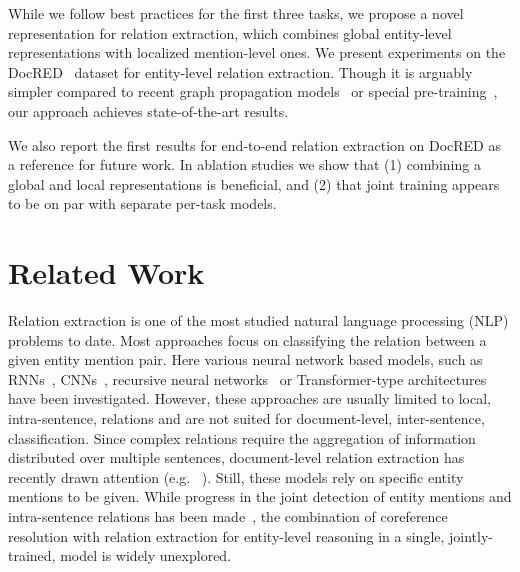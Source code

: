 \documentclass[11pt,a4paper]{article}
\begin{document}
While we follow best practices for the first three tasks, we propose a novel representation for relation extraction, which combines global entity-level representations with localized mention-level ones. 
We present experiments on the DocRED~\cite{yao:2019:docred} dataset for entity-level relation extraction. Though it is arguably simpler compared to recent graph propagation models~\cite{nan:2020:bert_lsr} or special pre-training~\cite{ye:2020:coref_bert}, our approach achieves state-of-the-art results. 
 
We also report the first results for end-to-end relation extraction on DocRED as a reference for future work. In ablation studies we show that (1) combining a global and local representations is beneficial, and (2) that joint training appears to be on par with separate per-task models.

\section{Related Work}
Relation extraction is one of the most studied natural language processing (NLP) problems to date. Most approaches focus on classifying the relation between a given entity mention pair. Here various neural network based models, such as RNNs~\cite{zhang:2015:rel_pos}, CNNs~\cite{zeng:2014:rel_cnn}, recursive neural networks~\cite{socher:2012:mv_rnn} or Transformer-type architectures~\cite{wu:2019:semeval_bert} have been investigated. However, these approaches are usually limited to local, intra-sentence, relations and are not suited for document-level, inter-sentence, classification. Since complex relations require the aggregation of information distributed over multiple sentences, document-level relation extraction has recently drawn attention (e.g. ~\citealt{quirk:2017:distant_intra_sentence_re,verga:2018:multi_instance,gupta:2019:intra_inter_re,yao:2019:docred}). Still, these models rely on specific entity mentions to be given. While progress in the joint detection of entity mentions and intra-sentence relations has been made~\cite{gupta:2016:table_filling, bekoulis:2018:multi_head, luan:2018:scierc}, the combination of coreference resolution with relation extraction for entity-level reasoning in a single, jointly-trained, model is widely unexplored. 
\end{document}
